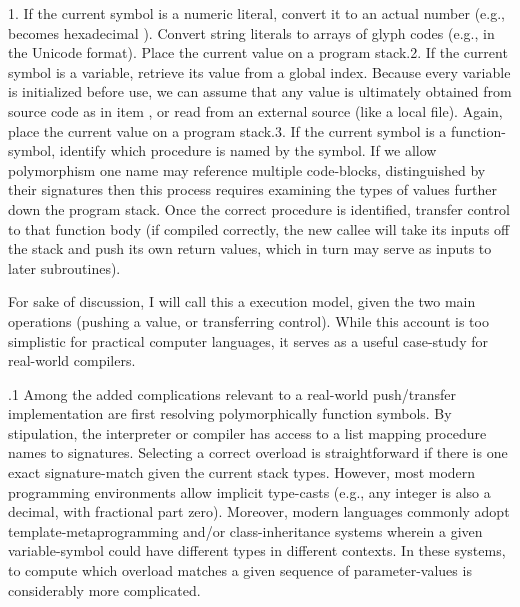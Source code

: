 \documentclass[11pt, twocolumn]{article}
\begin{document}
{{{\begin{docEnumerate}
1. If the current symbol is a numeric literal, convert it to an actual number
(e.g.,  becomes hexadecimal \OxFO{}). Convert
string literals to arrays of glyph
codes (e.g., in the Unicode \UTFonesix{} format). Place the current
value on a program stack.2. If the current symbol is a variable, retrieve
its value from a global index. Because every
variable is initialized before use, we can assume that
any value is ultimately obtained from source code
as in item , or read from an external source (like a local file).
Again, place the current value on a program stack.3. If the current symbol is a function-symbol, identify
which procedure is named by the symbol. If we allow
polymorphism \mdash{} one name may reference multiple code-blocks,
distinguished by their signatures \mdash{} then this process
requires examining the types of values further down the
program stack. Once the correct procedure is identified,
transfer control to that function body (if compiled
correctly, the new callee will take its inputs off the
stack and push its own return values, which in turn
may serve as inputs to later subroutines).

\end{docEnumerate}

\nip{}%
For sake of discussion, I will call this a  execution
model, given the two main operations (pushing a value, or transferring
control). While this account is too simplistic for practical computer
languages, it serves
as a useful case-study for real-world compilers.
}%

\p.1{%
Among the added complications relevant to a real-world push/transfer
implementation are \mdash{} first \mdash{} resolving polymorphically
 function symbols. By stipulation, the interpreter or compiler
has access to a list mapping procedure names to signatures.
Selecting a correct overload is straightforward if there is one exact
signature-match given the current stack types. However, most modern
programming environments allow implicit type-casts (e.g., any integer is also
a decimal, with fractional part zero). Moreover, modern languages commonly
adopt template-metaprogramming and/or class-inheritance systems wherein
a given variable-symbol could have different types in different
contexts. In these systems, to compute which overload matches a
given sequence of parameter-values is considerably more complicated.
}%

}}
\end{document}
